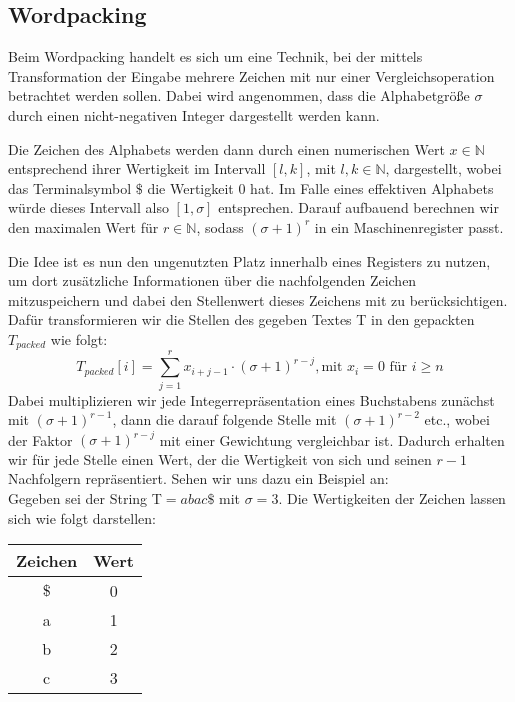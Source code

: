 \subsection{Wordpacking}
\label{wordpacking}
Beim Wordpacking \cite{Manber1993} handelt es sich um eine Technik,
bei der mittels Transformation der Eingabe mehrere Zeichen mit nur einer Vergleichsoperation betrachtet werden sollen.
Dabei wird angenommen, dass die Alphabetgröße $\sigma$ durch einen nicht-negativen Integer dargestellt werden kann.

Die Zeichen des Alphabets werden dann durch einen numerischen Wert $x \in \mathbb{N}$
entsprechend ihrer Wertigkeit im Intervall $[l,k]$, mit $l,k \in \mathbb{N}$, dargestellt,
wobei das Terminalsymbol $\$$ die Wertigkeit 0 hat.
Im Falle eines effektiven Alphabets würde dieses Intervall also $[1,\sigma]$ entsprechen.
Darauf aufbauend berechnen wir den maximalen Wert für $r \in \mathbb{N}$, sodass $(\sigma+1)^r$ in
ein Maschinenregister passt.

Die Idee ist es nun den ungenutzten Platz innerhalb eines Registers zu nutzen,
um dort zusätzliche Informationen über die nachfolgenden Zeichen mitzuspeichern
und dabei den Stellenwert dieses Zeichens mit zu berücksichtigen.
Dafür transformieren wir die Stellen des gegeben Textes T in den gepackten $T_{packed}$ wie folgt:
\begin{equation}
T_{packed}[i]= \sum_{j=1}^r x_{i+j-1}\cdot(\sigma+1)^{r-j}, \text{mit }  x_i =0 \text{ für } i\geq n
\end{equation}
Dabei multiplizieren wir jede Integerrepräsentation eines Buchstabens zunächst mit $(\sigma+1)^{r-1}$, dann die darauf folgende Stelle mit $(\sigma+1)^{r-2}$ etc., wobei der Faktor $(\sigma+1)^{r-j}$ mit einer Gewichtung vergleichbar ist. Dadurch erhalten wir für jede Stelle einen Wert, der die Wertigkeit von sich und seinen $r-1$ Nachfolgern repräsentiert. Sehen wir uns dazu ein Beispiel an:\\
Gegeben sei der String T$ = abac\$$ mit $\sigma=3$. Die Wertigkeiten der Zeichen lassen sich wie folgt darstellen: 
\begin{center}
\begin{tabular}{c | c}
Zeichen & Wert \\
\hline
$\$$ & 0 \\
a & 1 \\
b & 2 \\
c & 3 
\end{tabular}
\end{center}

